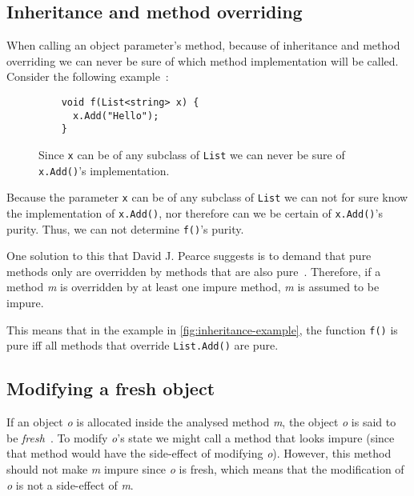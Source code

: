 \documentclass[a4paper,12pt]{article}
\begin{document}
\subsection{Inheritance and method overriding} \label{sub:inheritance}

When calling an object parameter's method, because of inheritance and method overriding we can never be sure of which method implementation will be called. Consider the following example~\cite{pearce2011jpure}:

\begin{figure}[H]
  \centering
  \begin{lstlisting}
    void f(List<string> x) {
      x.Add("Hello");
    }
  \end{lstlisting}
  \caption{Since \texttt{x} can be of any subclass of \texttt{List} we can never be sure of \texttt{x.Add()}'s implementation.}
  \label{fig:inheritance-example}
\end{figure}

Because the parameter \texttt{x} can be of any subclass of \texttt{List} we can not for sure know the implementation of \texttt{x.Add()}, nor therefore can we be certain of \texttt{x.Add()}'s purity. Thus, we can not determine \texttt{f()}'s purity.

One solution to this that David J. Pearce suggests is to demand that pure methods only are overridden by methods that are also pure~\cite{pearce2011jpure}. Therefore, if a method \textit{m} is overridden by at least one impure method, \textit{m} is assumed to be impure.

This means that in the example in \autoref{fig:inheritance-example}, the function \texttt{f()} is pure iff all methods that override \texttt{List.Add()} are pure.

\subsection{Modifying a fresh object} \label{sub:modifying-fresh-objects}

If an object \textit{o} is allocated inside the analysed method \textit{m}, the object \textit{o} is said to be \textit{fresh}~\cite{pearce2011jpure}. To modify \textit{o}'s state we might call a method that looks impure (since that method would have the side-effect of modifying \textit{o}). However, this method should not make \textit{m} impure since \textit{o} is fresh, which means that the modification of \textit{o} is not a side-effect of \textit{m}.
\end{document}
